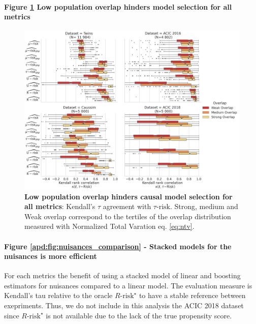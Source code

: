 \documentclass{report}
\begin{document}
\begin{appendices}
  \paragraph{Figure \ref{apd:fig:all_datasets_overlap_effect} Low population
    overlap hinders model selection for all metrics}



  \begin{figure}
    \centering
    \includegraphics[width=\textwidth]{img/chapter_5/_2_overlap_influence_overlap_by_bin_comparaison_kendall_by_Dataset.png}
    \hfill
    \caption{\textbf{Low population overlap hinders causal model selection for all
        metrics}:
      Kendall's $\tau$ agreement with $\tau\text{-risk}$. Strong, medium and Weak overlap
      correspond
      to the tertiles of the overlap distribution measured with Normalized Total
      Varation eq. \ref{eq:ntv}.}\label{apd:fig:all_datasets_overlap_effect}
  \end{figure}


  \paragraph{Figure \ref{apd:fig:nuisances_comparison} - Stacked models for the nuisances is more efficient}
  For each metrics the benefit of
  using a stacked model of linear and boosting estimators for nuisances compared
  to a linear model. The evaluation measure is Kendall's tau relative to the
  oracle $R\text{-risk}^{\star}$ to have a stable reference between exepriments.
  Thus, we do not include in this analysis the ACIC 2018 dataset since
  $R\text{-risk}^{\star}$ is not available due to the lack of the true propensity
  score.


\end{appendices}
\end{document}
